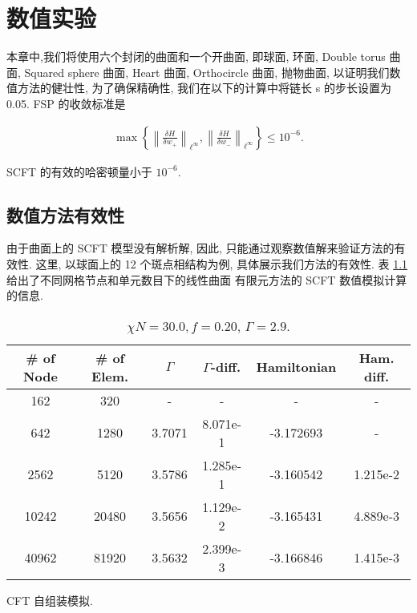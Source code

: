 \chapter{数值实验} \label{Chap:Results}
本章中,我们将使用六个封闭的曲面和一个开曲面, 即球面, 环面, Double torus 曲面, Squared
sphere 曲面, Heart 曲面, Orthocircle 曲面, 抛物曲面, 以证明我们数值方法的健壮性, 
为了确保精确性, 我们在以下的计算中将链长 s 的步长设置为 0.05. FSP 的收敛标准是

\begin{align}
	\max\left\{
	\left\|\frac{\delta H}{\delta w_+} \right\|_{\ell^\infty},
    \left\|\frac{\delta H}{\delta w_-} \right\|_{\ell^\infty}
\right\} \leq 10^{-6}.
	\label{}
\end{align}

SCFT 的有效的哈密顿量小于 $10^{-6}$. 

\section{数值方法有效性}

由于曲面上的 SCFT 模型没有解析解, 因此, 只能通过观察数值解来验证方法的有效性. 这里, 以球面上的 12
个斑点相结构为例, 具体展示我们方法的有效性. 表 \ref{tab:refinemesh} 给出了不同网格节点和单元数目下的线性曲面
有限元方法的 SCFT 数值模拟计算的信息.

\begin{table}[H]
\caption{$\chi N=30.0, f=0.20$, $\Gamma=2.9$.}
  \label{tab:refinemesh}
  \centering
\begin{tabular}{|c|c|c|c|c|c|}
 \hline
 \# of Node  & \# of Elem. & $\Gamma$ & $\Gamma$-diff. & Hamiltonian &
 Ham. diff. \\
 \hline
162  & 320   & -  & - & -&  -  \\ 
 \hline
 642   & 1280  & 3.7071  & 8.071e-1 & -3.172693  & - \\
 \hline
2562  & 5120  & 3.5786  & 1.285e-1 & -3.160542 &  1.215e-2\\
 \hline
10242 & 20480 & 3.5656  & 1.129e-2 & -3.165431 & 4.889e-3\\
 \hline
40962 & 81920 & 3.5632  & 2.399e-3 & -3.166846 & 1.415e-3 \\
 \hline
\end{tabular}
\end{table}


CFT 自组装模拟.
